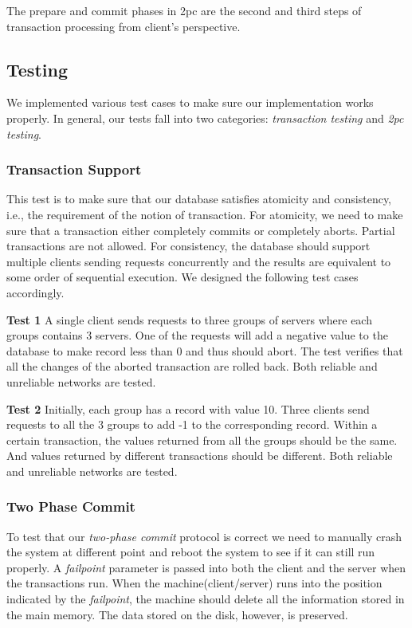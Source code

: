 \documentclass{vldb}
\begin{document}
The prepare and commit phases in 2pc are the second and third steps of 
transaction processing from client's perspective.

\subsection{Testing}

We implemented various test cases to make sure our implementation 
works properly. In general, our tests fall into two categories: 
\textit{transaction testing} and \textit{2pc testing}. 

\subsubsection{Transaction Support}

This test is to make sure that our database satisfies atomicity and 
consistency, i.e., the requirement of the notion of transaction. For 
atomicity, we need to make sure that a transaction either completely 
commits or completely aborts. Partial transactions are not allowed.  
For consistency, the database should support multiple clients sending 
requests concurrently and the results are equivalent to some order of 
sequential execution. We designed the following test cases 
accordingly.

\textbf{Test 1} A single client sends requests to three groups of 
servers where each groups contains 3 servers. One of the requests
will add a negative value to the database to make record less than 0 
and thus should abort. The test verifies that all the changes of the 
aborted transaction are rolled back. Both reliable and unreliable 
networks are tested.

\textbf{Test 2} Initially, each group has a record with value 10.  
Three clients send requests to all the 3 groups to add -1 to the 
corresponding record. Within a certain transaction, the values 
returned from all the groups should be the same. And values returned 
by different transactions should be different. Both reliable and 
unreliable networks are tested.

\subsubsection{Two Phase Commit}

To test that our \textit{two-phase commit} protocol is correct we need 
to manually crash the system at different point and reboot the system 
to see if it can still run properly. A \textit{failpoint} parameter is 
passed into both the client and the server when the transactions run.  
When the machine(client/server) runs into the position indicated by 
the \textit{failpoint}, the machine should delete all the information 
stored in the main memory. The data stored on the disk, however, is 
preserved.
\end{document}
